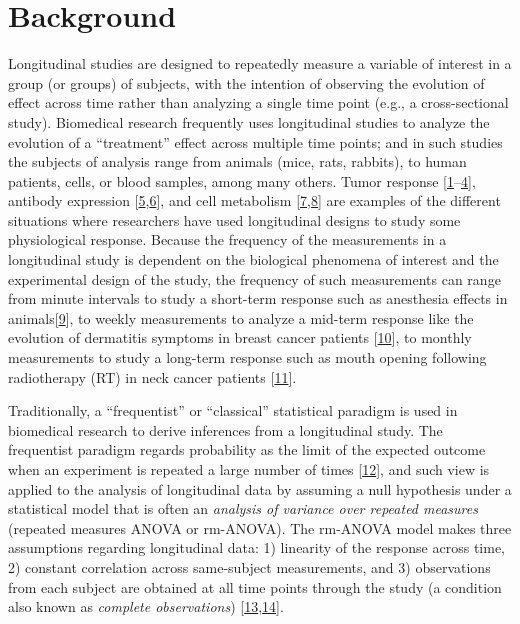 \documentclass[
]{article}
\begin{document}
\hypertarget{background}{%
\section{Background}\label{background}}

Longitudinal studies are designed to repeatedly measure a variable of interest in a group (or groups) of subjects, with the intention of observing the evolution of effect across time rather than analyzing a single time point (e.g., a cross-sectional study). Biomedical research frequently uses longitudinal studies to analyze the evolution of a ``treatment'' effect across multiple time points; and in such studies the subjects of analysis range from animals (mice, rats, rabbits), to human patients, cells, or blood samples, among many others. Tumor response {[}\protect\hyperlink{ref-roblyer2011}{1}--\protect\hyperlink{ref-demidov2018}{4}{]}, antibody expression {[}\protect\hyperlink{ref-ritter2001}{5},\protect\hyperlink{ref-roth2017}{6}{]}, and cell metabolism {[}\protect\hyperlink{ref-jones2018}{7},\protect\hyperlink{ref-skala2010}{8}{]} are examples of the different situations where researchers have used longitudinal designs to study some physiological response. Because the frequency of the measurements in a longitudinal study is dependent on the biological phenomena of interest and the experimental design of the study, the frequency of such measurements can range from minute intervals to study a short-term response such as anesthesia effects in animals{[}\protect\hyperlink{ref-greening2018}{9}{]}, to weekly measurements to analyze a mid-term response like the evolution of dermatitis symptoms in breast cancer patients {[}\protect\hyperlink{ref-sio2016}{10}{]}, to monthly measurements to study a long-term response such as mouth opening following radiotherapy (RT) in neck cancer patients {[}\protect\hyperlink{ref-kamstra2015}{11}{]}.

Traditionally, a ``frequentist'' or ``classical'' statistical paradigm is used in biomedical research to derive inferences from a longitudinal study. The frequentist paradigm regards probability as the limit of the expected outcome when an experiment is repeated a large number of times {[}\protect\hyperlink{ref-wagenmakers2008}{12}{]}, and such view is applied to the analysis of longitudinal data by assuming a null hypothesis under a statistical model that is often an \emph{analysis of variance over repeated measures} (repeated measures ANOVA or rm-ANOVA). The rm-ANOVA model makes three assumptions regarding longitudinal data: 1) linearity of the response across time, 2) constant correlation across same-subject measurements, and 3) observations from each subject are obtained at all time points through the study (a condition also known as \emph{complete observations}) {[}\protect\hyperlink{ref-gueorguieva2004}{13},\protect\hyperlink{ref-schober2018}{14}{]}.
\end{document}
